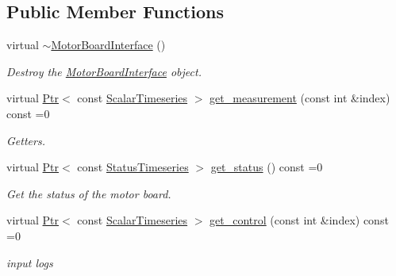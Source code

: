 \subsection*{Public Member Functions}
\begin{DoxyCompactItemize}
\item 
\mbox{\label{classblmc__drivers_1_1MotorBoardInterface_aecd23682c4a8c0df8e57b4c752e1d9ee}} 
virtual \hyperlink{classblmc__drivers_1_1MotorBoardInterface_aecd23682c4a8c0df8e57b4c752e1d9ee}{$\sim$\+Motor\+Board\+Interface} ()
\begin{DoxyCompactList}\small\item\em Destroy the \hyperlink{classblmc__drivers_1_1MotorBoardInterface}{Motor\+Board\+Interface} object. \end{DoxyCompactList}\item 
virtual \hyperlink{classblmc__drivers_1_1MotorBoardInterface_a6a733b7ed7a3a96f6b0712b6bb5307f8}{Ptr}$<$ const \hyperlink{classblmc__drivers_1_1MotorBoardInterface_a14e237254ba495a66091ea3a3a33fa75}{Scalar\+Timeseries} $>$ \hyperlink{classblmc__drivers_1_1MotorBoardInterface_a34828a0375a3bd1fede4deb4fc74c04d}{get\+\_\+measurement} (const int \&index) const =0
\begin{DoxyCompactList}\small\item\em Getters. \end{DoxyCompactList}\item 
virtual \hyperlink{classblmc__drivers_1_1MotorBoardInterface_a6a733b7ed7a3a96f6b0712b6bb5307f8}{Ptr}$<$ const \hyperlink{classblmc__drivers_1_1MotorBoardInterface_ae3777e484dda60c4abe87f2b542ddfb8}{Status\+Timeseries} $>$ \hyperlink{classblmc__drivers_1_1MotorBoardInterface_a13b1ffa7d10c1c753d76eaf5368714e3}{get\+\_\+status} () const =0
\begin{DoxyCompactList}\small\item\em Get the status of the motor board. \end{DoxyCompactList}\item 
virtual \hyperlink{classblmc__drivers_1_1MotorBoardInterface_a6a733b7ed7a3a96f6b0712b6bb5307f8}{Ptr}$<$ const \hyperlink{classblmc__drivers_1_1MotorBoardInterface_a14e237254ba495a66091ea3a3a33fa75}{Scalar\+Timeseries} $>$ \hyperlink{classblmc__drivers_1_1MotorBoardInterface_aa5eeed12c851993f2e2c93f5479df9de}{get\+\_\+control} (const int \&index) const =0
\begin{DoxyCompactList}\small\item\em input logs \end{DoxyCompactList}\item 

\end{DoxyCompactItemize}
